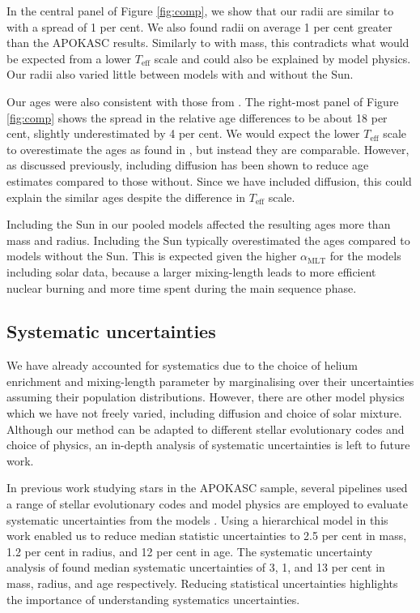 \documentclass[a4paper,fleqn,usenatbib]{mnras}
\newcommand{\teff}{\ensuremath{T_\mathrm{eff}}}
\newcommand{\mlt}{\ensuremath{{\alpha_\mathrm{MLT}}}}
\begin{document}
In the central panel of Figure \ref{fig:comp}, we show that our radii are similar to  with a spread of 1 per cent. We also found radii on average 1 per cent greater than the APOKASC results. Similarly to with mass, this contradicts what would be expected from a lower $\teff$ scale and could also be explained by model physics. Our radii also varied little between models with and without the Sun.

Our ages were also consistent with those from . The right-most panel of Figure \ref{fig:comp} shows the spread in the relative age differences to be about 18 per cent, slightly underestimated by 4 per cent. We would expect the lower $\teff$ scale to overestimate the ages as found in , but instead they are comparable. However, as discussed previously, including diffusion has been shown to reduce age estimates compared to those without. Since we have included diffusion, this could explain the similar ages despite the difference in $\teff$ scale.

Including the Sun in our pooled models affected the resulting ages more than mass and radius. Including the Sun typically overestimated the ages compared to models without the Sun. This is expected given the higher $\mlt$ for the models including solar data, because a larger mixing-length leads to more efficient nuclear burning and more time spent during the main sequence phase. 

\subsection{Systematic uncertainties}\label{sec:sys}

We have already accounted for systematics due to the choice of helium enrichment and mixing-length parameter by marginalising over their uncertainties assuming their population distributions. However, there are other model physics which we have not freely varied, including diffusion and choice of solar mixture. Although our method can be adapted to different stellar evolutionary codes and choice of physics, an in-depth analysis of systematic uncertainties is left to future work. 

In previous work studying stars in the APOKASC sample, several pipelines used a range of stellar evolutionary codes and model physics are employed to evaluate systematic uncertainties from the models \citep{Serenelli.Johnson.ea2017, SilvaAguirre.Lund.ea2017}. Using a hierarchical model in this work enabled us to reduce median statistic uncertainties to 2.5 per cent in mass, 1.2 per cent in radius, and 12 per cent in age. The systematic uncertainty analysis of  found median systematic uncertainties of 3, 1, and 13 per cent in mass, radius, and age respectively. Reducing statistical uncertainties highlights the importance of understanding systematics uncertainties.
\end{document}
